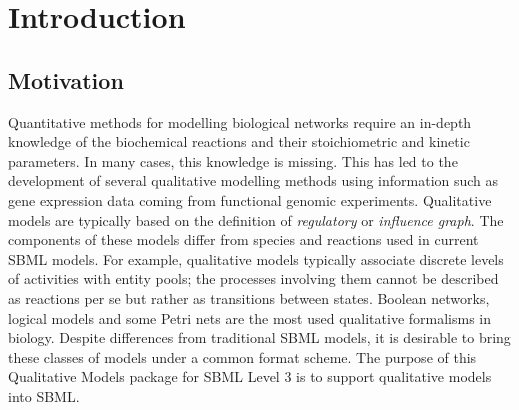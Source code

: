 
\section{Introduction}
\label{intro}

\subsection{Motivation}
Quantitative methods for modelling biological networks require an in-depth knowledge of the biochemical reactions and their stoichiometric and kinetic parameters. In many cases, this knowledge is missing. This has led to the development of several qualitative modelling methods using information such as gene expression data coming from functional genomic experiments. Qualitative models are typically based on the definition of \emph{regulatory} or \emph{influence graph}. The components of these models differ from species and reactions used in current SBML models. For example, qualitative models typically associate discrete levels of activities with entity pools; the processes involving them cannot be described as reactions per se but rather as transitions between states. Boolean networks, logical models and some Petri nets are the most used qualitative formalisms in biology. Despite differences from traditional SBML models, it is desirable to bring these classes of models under a common format scheme. The purpose of this Qualitative Models package for SBML Level 3 is to support qualitative models into SBML.




